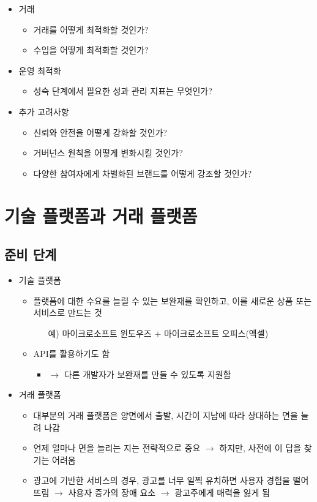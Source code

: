 \begin{itemize}
\begin{itemize}
\begin{itemize}
		\end{itemize}	
	\item 거래
		\begin{itemize}
		\item 거래를 어떻게 최적화할 것인가?
		\item 수입을 어떻게 최적화할 것인가?
		\end{itemize}	
	\item 운영 최적화	
		\begin{itemize}
		\item 성숙 단계에서 필요한 성과 관리 지표는 무엇인가?
		\end{itemize}	
	\item 추가 고려사항
		\begin{itemize}
		\item 신뢰와 안전을 어떻게 강화할 것인가?
		\item 거버넌스 원칙을 어떻게 변화시킬 것인가?
		\item 다양한 참여자에게 차별화된 브랜드를 어떻게 강조할 것인가?
		\end{itemize}
	\end{itemize}		
\end{itemize}

\section{기술 플랫폼과 거래 플랫폼}
\subsection{준비 단계}
\begin{itemize}
\item 기술 플랫폼 \cite[ch. 3]{Cusumano:2019aa}
	\begin{itemize}
	\item 플랫폼에 대한 수요를 늘릴 수 있는 보완재를 확인하고, 이를 새로운 상품 또는 서비스로 만드는 것
		\begin{itemize}
		\item[예)] 마이크로소프트 윈도우즈 $+$ 마이크로소프트 오피스(엑셀) 
		\end{itemize}
	\item API를 활용하기도 함
		\begin{itemize}
		\item $\rightarrow$ 다른 개발자가 보완재를 만들 수 있도록 지원함
		\end{itemize}
	\end{itemize}
\item 거래 플랫폼
	\begin{itemize}
	\item 대부분의 거래 플랫폼은 양면에서 출발, 시간이 지남에 따라 상대하는 면을 늘려 나감
	\item 언제 얼마나 면을 늘리는 지는 전략적으로 중요 $\rightarrow$ 하지만, 사전에 이 답을 찾기는 어려움
	\item 광고에 기반한 서비스의 경우, 광고를 너무 일찍 유치하면 사용자 경험을 떨어뜨림 $\rightarrow$ 사용자 증가의 장애 요소 $\rightarrow$ 광고주에게 매력을 잃게 됨
	\end{itemize}
\end{itemize}

